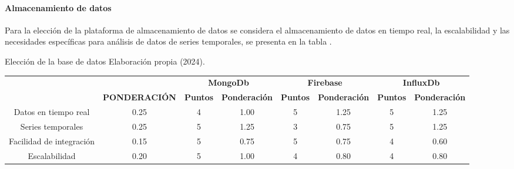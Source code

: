 \paragraph{Almacenamiento de datos}
Para la elección de la plataforma de almacenamiento de datos se considera el almacenamiento de datos en tiempo real, la escalabilidad y las necesidades específicas para análisis de datos de series temporales, se presenta en la tabla .
\begin{tabla}[dat] 
{Elección de la base de datos}
{Elaboración propia (2024).}
\centering
\resizebox{15cm}{!}
{
\begin{tabular}{|c|c|c|c|c|c|c|c|} 
\hline
\rowcolor[rgb]{0.678,0.702,0.698} {\cellcolor[rgb]{0.678,0.702,0.698}}                                    & {\cellcolor[rgb]{0.678,0.702,0.698}}                                       & \multicolumn{2}{c|}{\textbf{MongoDb}}  & \multicolumn{2}{c|}{\textbf{Firebase}} & \multicolumn{2}{c|}{\textbf{InfluxDb}}  \\
\rowcolor[rgb]{0.678,0.702,0.698} \multirow{-2}{*}{{\cellcolor[rgb]{0.678,0.702,0.698}}\textbf{CRITERIO}} & \multirow{-2}{*}{{\cellcolor[rgb]{0.678,0.702,0.698}}\textbf{PONDERACIÓN}} & \textbf{Puntos} & \textbf{Ponderación} & \textbf{Puntos} & \textbf{Ponderación} & \textbf{Puntos} & \textbf{Ponderación}  \\ 
\hline
\rowcolor[rgb]{0.027,0.894,0.698} Datos en tiempo real                                                    & 0.25                                                                       & 4               & 1.00                 & 5               & 1.25                 & 5               & 1.25                  \\ 
\hline
\rowcolor[rgb]{0.027,0.894,0.675} Series temporales                                                       & 0.25                                                                       & 5               & 1.25                 & 3               & 0.75                 & 5               & 1.25                  \\ 
\hline
Facilidad de integración                                                                                  & 0.15                                                                       & 5               & 0.75                 & 5               & 0.75                 & 4               & 0.60                  \\ 
\hline
\rowcolor[rgb]{0.027,0.894,0.675} Escalabilidad                                                           & 0.20                                                                       & 5               & 1.00                 & 4               & 0.80                 & 4               & 0.80                  \\ 

\end{tabular}}
\end{tabla}
